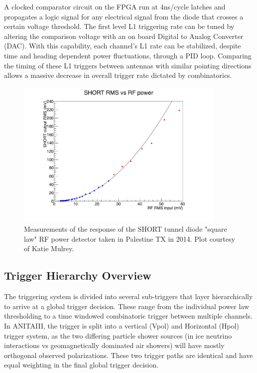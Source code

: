 		A clocked comparator circuit on the FPGA run at 4ns/cycle latches and propagates a logic signal for any electrical signal from the diode that crosses a certain voltage threshold.  The first level L1 triggering rate can be tuned by altering the comparison voltage with an on board Digital to Analog Converter (DAC). With this capability, each channel's L1 rate can be stabilized, despite time and heading dependent power fluctuations, through a PID loop.  Comparing the timing of these L1 triggers between antennas with similar pointing directions allows a massive decrease in overall trigger rate dictated by combinatorics.
		
\begin{figure}
	\centering
	\includegraphics[width=0.9\textwidth]{figures/RMS_in_out}
	\caption{Measurements of the response of the SHORT tunnel diode "square law" RF power detector taken in Palestine TX in 2014.  Plot courtesy of Katie Mulrey.}
	\label{fig:SHORT_square}
\end{figure}
		
	
	\subsection{Trigger Hierarchy Overview}
		The triggering system is divided into several sub-triggers that layer hierarchically to arrive at a global trigger decision.   These range from the individual power law thresholding to a time windowed combinatoric trigger between multiple channels.  In ANITAIII, the trigger is split into a vertical (Vpol) and Horizontal (Hpol) trigger system, as the two differing particle shower sources (in ice neutrino interactions vs geomagnetically dominated air showers) will have mostly orthogonal observed polarizations.  These two trigger paths are identical and have equal weighting in the final global trigger decision.  
		
